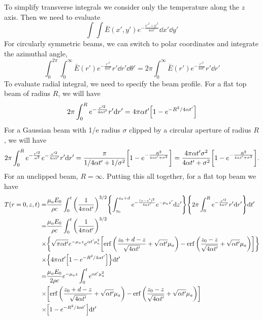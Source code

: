 \documentclass[]{article}
\begin{document}
To simplify transverse integrals we consider only the temperature along the $z$ axis. Then
we need to evaluate
\begin{equation*}
    \int \int \bar{E}(x',y') e^{-\frac{x'^2 + y'^2}{4\alpha t'}} \dd x' \dd y'
\end{equation*}
For circularly symmetric beams, we can switch to polar coordinates and
integrate the azimuthal angle,
\begin{equation*}
    \int_0^{2\pi} \int_0^\infty \bar{E}(r') e^{-\frac{r'^2}{4\alpha t'}} r'\dd r' \dd \theta'
    = 2\pi \int_0^\infty  \bar{E}(r') e^{-\frac{r'^2}{4\alpha t'}} r'\dd r'
\end{equation*}
To evaluate radial integral, we need to specify the beam profile. For a flat top
beam of radius $R$, we will have
\begin{equation*}
  2\pi \int_0^R e^{-\frac{r'^2}{4\alpha t'}} r'\dd r'
  =  4\pi \alpha t' \qty[1 - e^{-R^2/4\alpha t'}]
\end{equation*}
For a Gaussian beam with 1/e radius $\sigma$ clipped by a circular aperture of radius $R$, we will have
\begin{equation*}
2\pi \int_0^R e^{-\frac{r'^2}{\sigma^2}} e^{-\frac{r'^2}{4\alpha t'}} r'\dd r'
=  \frac{\pi}{1/4\alpha t' + 1/\sigma^2} \qty[1 - e^{-\frac{R^2}{4\alpha t' + \sigma^2}}]
=  \frac{4 \pi \alpha t' \sigma^2}{4\alpha t' + \sigma^2} \qty[1 - e^{-\frac{R^2}{4\alpha t' + \sigma^2}}]
.
\end{equation*}
For an unclipped beam, $R = \infty$. Putting this all together, for a flat top beam we have
\begin{align}
  \label{eq:flattop_temp}
  T(r=0, z,t) =& \frac{\mu_aE_0}{\rho c} \int_0^t \qty(\frac{1}{4\pi \alpha t'})^{3/2} \qty{\int_{z_0}^{z_0 + d}e^{-\frac{(z-z')^2}{4\alpha t'}} e^{-\mu_a z'} \dd z'} \qty{2\pi\int_{0}^{R} e^{-\frac{r'^2}{4\alpha t'}}r'\dd r'}\dd t' \\
  =& \frac{\mu_a E_0}{\rho c} \int_0^t \qty(\frac{1}{4\pi \alpha t'})^{3/2}  \\
  \times & \qty{\sqrt{\pi\alpha t'} e^{-\mu_a z} e^{\alpha t'\mu_a^2}\qty[\erf\qty(\frac{z_0 + d - z}{\sqrt{4\alpha t'}} + \sqrt{\alpha t'}\mu_a ) - \erf\qty(\frac{z_0 - z}{\sqrt{4\alpha t'}} + \sqrt{\alpha t'}\mu_a ) ]} \\
  \times & \qty{4\pi \alpha t' \qty[1 - e^{-R^2/4\alpha t'}] }
  \dd t' \\
  =& \frac{\mu_aE_0}{2\rho c}e^{-\mu_a z} \int_0^t e^{\alpha t'\mu_a^2}  \\
  \times & \qty[\erf\qty(\frac{z_0 + d - z}{\sqrt{4\alpha t'}} + \sqrt{\alpha t'}\mu_a ) - \erf\qty(\frac{z_0 - z}{\sqrt{4\alpha t'}} + \sqrt{\alpha t'}\mu_a ) ] \\
  \times & \qty[1 - e^{-R^2/4\alpha t'} ]
  \dd t'
\end{align}
\end{document}
